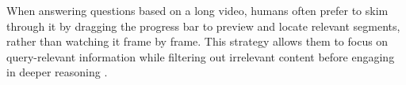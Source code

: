 When answering questions based on a long video, humans often prefer to skim through it by dragging the progress bar to preview and locate relevant segments, rather than watching it frame by frame. This strategy allows them to focus on query-relevant information while filtering out irrelevant content before engaging in deeper reasoning \citep{wu2024v}.




